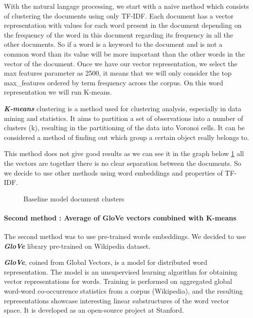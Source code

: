 \documentclass[journal,twocolumn]{IEEEtran}
\begin{document}
With the natural langage processing, we start with a naive method which
consists of clustering the documents using only TF-IDF. Each document
has a vector representation with values for each word present in the
document depending on the frequency of the word in this document
regarding its frequency in all the other documents. So if a word is a
keyword to the document and is not a common word than its value will be
more important than the other words in the vector of the document. Once
we have our vector representation, we select the max features parameter
as 2500, it means that we will only consider the top max\_features
ordered by term frequency across the corpus. On this word representation
we will run K-means.

\textbf{\emph{K-means}} clustering is a method used for clustering
analysis, especially in data mining and statistics. It aims to partition
a set of observations into a number of clusters (k), resulting in the
partitioning of the data into Voronoi cells. It can be considered a
method of finding out which group a certain object really belongs to.

This method does not give good results as we can see it in the graph
below \ref{fig3} all the vectors are together there is no clear
separation between the documents. So we decide to use other methods
using word embeddings and properties of TF-IDF.


    \begin{figure}
        \begin{center}\end{center}
        \caption{Baseline model document clusters}
        \label{fig3}
    \end{figure}
    
    \hypertarget{second-method-average-of-glove-vectors-combined-with-k-means}{%
\paragraph{Second method : Average of GloVe vectors combined with
K-means}\label{second-method-average-of-glove-vectors-combined-with-k-means}}

The second method was to use pre-trained words embeddings. We decided to
use \textbf{\emph{GloVe}} library pre-trained on Wikipedia dataset.

\textbf{\emph{GloVe}}, coined from Global Vectors, is a model for
distributed word representation. The model is an unsupervised learning
algorithm for obtaining vector representations for words. Training is
performed on aggregated global word-word co-occurrence statistics from a
corpus (Wikipedia), and the resulting representations showcase
interesting linear substructures of the word vector space. It is
developed as an open-source project at Stanford.\cite{GloVe}
\end{document}
